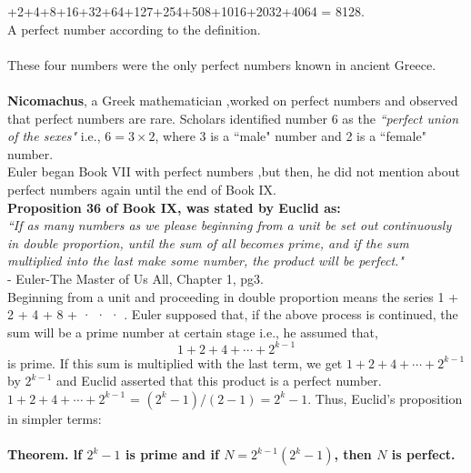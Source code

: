\documentclass[a4paper,11pt]{article}
\begin{document}
+2+4+8+16+32+64+127+254+508+1016+2032+4064 = 8128. \\A perfect number according to the definition.\\
\\
These four numbers were the only perfect numbers known in ancient Greece.\\ 
\\ \textbf{Nicomachus}, a Greek mathematician ,worked on perfect numbers and observed that perfect numbers are rare. Scholars identified number 6 as the \textit{``perfect union of the sexes"} i.e., $ 6=3\times2$, where 3 is a ``male" number and 2 is a ``female" number.\\
Euler began Book VII with perfect numbers ,but then, he did not mention about perfect numbers again until the end of Book IX.\\

\noindent \textbf{Proposition 36 of Book IX, was stated by Euclid as: }\\

\textit{``If as many numbers as we please beginning from a unit be set out 
continuously in double proportion, until the sum of all becomes 
prime, and if the sum multiplied into the last make some number, the 
product will be perfect."}\\
\vspace{2ex}
\hfill {- Euler-The Master of Us All, Chapter 1, pg3.}
\\
Beginning from a unit and proceeding in double 
proportion means the series 1 + 2 + 4 + 8 + · · · . 
Euler supposed that, if the above process is continued, the sum will be a prime 
number at certain stage i.e., he assumed that,\\
$$1 + 2 + 4 +\cdots+2^{k
-
1}$$ is prime. 
If this sum is multiplied with the last term, we get 
$1 + 2 + 4 + \cdots + 2^
{k
- 1}$ by $ 2^
{k- 1}$ and Euclid
asserted that this product is a perfect number. \\
 $ 1 + 2 + 4 + \cdots + 2^{
k
- 1}$  = $(2^k - 1 )/(2 - 1) = 2^
k - 1.$ Thus, Euclid's 
proposition in simpler terms:\\
\\
\textbf{Theorem. lf $2^k - 1$ is prime and if $N = 2^{
k-1}
(2^k - 1)$, then $N $ is perfect. }\\
\end{document}
